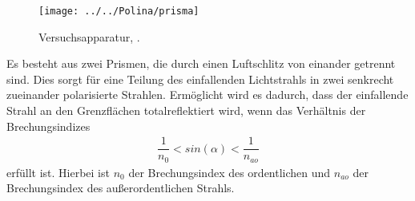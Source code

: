 \begin{figure}[h!]
	\centering
	\texttt{[image: ../../Polina/prisma]}
	\caption{Versuchsapparatur, \cite{anleitungV46}.}
	\label{fig:prisma}
\end{figure}

Es besteht aus zwei Prismen, die durch einen Luftschlitz von einander getrennt sind. Dies sorgt für eine Teilung des einfallenden Lichtstrahls in zwei senkrecht zueinander polarisierte Strahlen. Ermöglicht wird es dadurch, dass der einfallende Strahl an den Grenzflächen totalreflektiert wird, wenn das Verhältnis der Brechungsindizes 
\begin{align}
\dfrac{1}{n_0}<sin(\alpha)<\dfrac{1}{n_{ao}}
\end{align}
erfüllt ist. Hierbei ist $n_0$ der Brechungsindex des ordentlichen und $n_{ao}$ der Brechungsindex des außerordentlichen Strahls. 
